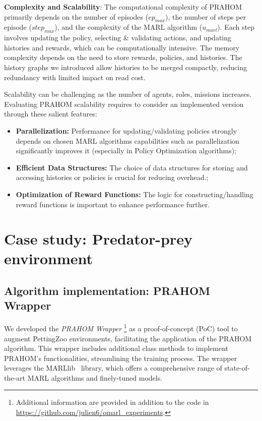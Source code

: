 \documentclass[conference]{IEEEtran}
\begin{document}
\textbf{Complexity and Scalability}: \quad The computational complexity of PRAHOM primarily depends on the number of episodes ($ep_{max}$), the number of steps per episode ($step_{max}$), and the complexity of the MARL algorithm ($u_{marl}$). Each step involves updating the policy, selecting \& validating actions, and updating histories and rewards, which can be computationally intensive. The memory complexity depends on the need to store rewards, policies, and histories. The history graphs we introduced allow histories to be merged compactly, reducing redundancy with limited impact on read cost.

Scalability can be challenging as the number of agents, roles, missions increases. Evaluating PRAHOM scalability requires to consider an implemented version through these salient features:
\begin{itemize}
    \item \textbf{Parallelization:} Performance for updating/validating policies strongly depends on chosen MARL algorithms capabilities such as parallelization significantly improves it (especially in Policy Optimization algorithms);
    \item \textbf{Efficient Data Structures:} The choice of data structures for storing and accessing histories or policies is crucial for reducing overhead.;
    \item \textbf{Optimization of Reward Functions:} The logic for constructing/handling reward functions is important to enhance performance further.
\end{itemize}


\section{Case study: Predator-prey environment}

\subsection{Algorithm implementation: PRAHOM Wrapper}

We developed the \textit{PRAHOM Wrapper}
%
\footnote{Additional information are provided in addition to the code in \url{https://github.com/julien6/omarl_experiments}.}
%
as a proof-of-concept (PoC) tool to augment PettingZoo environments, facilitating the application of the PRAHOM algorithm. This wrapper includes additional class methods to implement PRAHOM's functionalities, streamlining the training process. The wrapper leverages the MARLlib~\cite{hu2022marllib} library, which offers a comprehensive range of state-of-the-art MARL algorithms and finely-tuned models.
\end{document}
